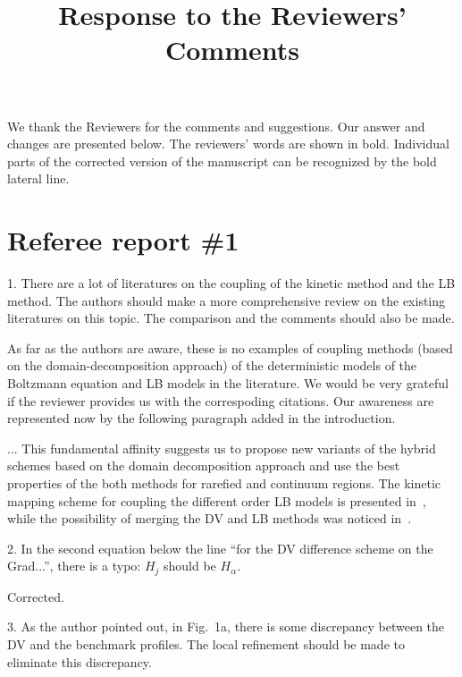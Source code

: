 \documentclass{article}
\title{Response to the Reviewers' Comments}
\begin{document}
\maketitle

We thank the Reviewers for the comments and suggestions.
Our answer and changes are presented below.
The reviewers' words are shown in bold.
Individual parts of the corrected version of the manuscript
can be recognized by the bold lateral line.

\section*{Referee report \#1}

\begin{quoting}
    1. There are a lot of literatures on the coupling of the kinetic method and the LB method.
    The authors should make a more comprehensive review on the existing literatures on this topic.
    The comparison and the comments should also be made.
\end{quoting}

As far as the authors are aware, these is no examples of coupling methods (based on the domain-decomposition approach)
of the deterministic models of the Boltzmann equation and LB models in the literature.
We would be very grateful if the reviewer provides us with the correspoding citations.
Our awareness are represented now by the following paragraph added in the introduction.

\begin{leftbar}
    ... This fundamental affinity suggests us to propose new variants of the hybrid schemes
    based on the domain decomposition approach and use the best properties of the both methods for rarefied and continuum regions.
    The kinetic mapping scheme for coupling the different order LB models is presented in~\cite{Meng2011},
    while the possibility of merging the DV and LB methods was noticed in~\cite{Succi2016}.
\end{leftbar}

\begin{quoting}
    2. In the second equation below the line ``for the DV difference scheme on the Grad...'',
    there is a typo: \(H_j\) should be \(H_{\alpha}\).
\end{quoting}

Corrected.

\begin{quoting}
    3. As the author pointed out, in Fig.~1a, there is some discrepancy between the DV and the benchmark profiles.
    The local refinement should be made to eliminate this discrepancy.
\end{quoting}
\end{document}
